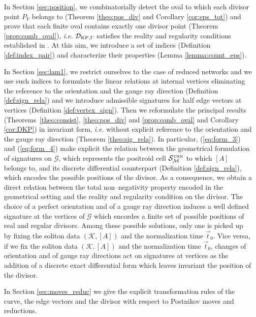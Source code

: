 \documentclass[11pt]{amsart}
\theoremstyle{plain}
\numberwithin{equation}{section}
\def \DKP {{\mathcal D}_{\textup{\scriptsize KP},\Gamma}}
\def \S {{\mathcal S}_{\mathcal M}^{\mbox{\tiny TNN}}}
\begin{document}
In Section \ref{sec:position}, we combinatorially detect the oval to which each divisor point $P_V$ belongs to (Theorem \ref{theo:pos_div} and Corollary \ref{cor:eps_tot}) and prove that each finite oval contains exactly one divisor point (Theorem \ref{prop:comb_oval}), {\sl i.e.} $\DKP$ satisfies the reality and regularity conditions established in \cite{DN}. At this aim, we introduce a set of indices
(Definition \ref{def:index_pair}) and characterize their properties (Lemma \ref{lemma:count_eps}). 

In Section \ref{sec:lam1}, we restrict ourselves to the case of reduced networks and we use such indices to formulate the linear relations at internal vertices eliminating the reference to the orientation and the gauge ray direction  (Definition \ref{def:sign_rela}) and we introduce admissible signatures for half edge vectors at vertices (Definition \ref{def:vertex_sign}). Then we reformulate the principal results (Theorems~\ref{theo:consist}, \ref{theo:pos_div} and \ref{prop:comb_oval} and Corollary \ref{cor:DKP}) in invariant form, {\sl i.e.} without explicit reference to the orientation and the gauge ray direction (Theorem \ref{theo:sig_rela}). 
In particular, (\ref{eq:form_3}) and  (\ref{eq:form_4}) make explicit the relation between the geometrical formulation of signatures on $\mathcal G$, which represents the positroid cell $\S$ to which $[A]$ belongs to, and its discrete differential counterpart (Definition \ref{def:sign_rela}), which encodes the possible positions of the divisor. As a consequence, we obtain a direct
relation between the total non--negativity property encoded in the geometrical setting and the reality and regularity condition on the divisor. The choice of a perfect orientation and of a gauge ray direction induces a well defined signature at the vertices of $\mathcal G$ which encordes a finite set of possible positions of real and regular divisors. Among these possible solutions, only one is picked up by fixing the soliton data $(\mathcal K, [A])$ and the normalization time $\vec t_0$.
Vice versa, if we fix the soliton data $(\mathcal K, [A])$ and the normalization time $\vec t_0$, changes of orientation and of gauge ray directions act on signatures at vertices as the addition of a discrete exact differential form which leaves invariant the position of the divisor. 

In Section \ref{sec:moves_reduc} we give the explicit transformation rules of the curve, the edge vectors and the divisor with respect to Postnikov moves and reductions. 
\end{document}
